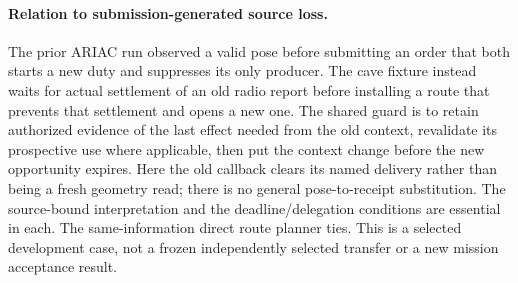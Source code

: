\documentclass{article}
\begin{document}
\paragraph{Relation to submission-generated source loss.}
The prior ARIAC run observed a valid pose before submitting
an order that both starts a new duty and suppresses its only
producer. The cave fixture instead waits for actual settlement
of an old radio report before installing a route that prevents
that settlement and opens a new one. The shared guard is to
retain authorized evidence of the last effect needed from the
old context, revalidate its prospective use where applicable,
then put the context change before the new opportunity expires.
Here the old callback clears its named delivery rather than
being a fresh geometry read; there is no general pose-to-receipt
substitution. The source-bound interpretation and the
deadline/delegation conditions are essential in each. The
same-information direct route planner ties. This is a selected
development case, not a frozen independently selected transfer
or a new mission acceptance result.
\end{document}
